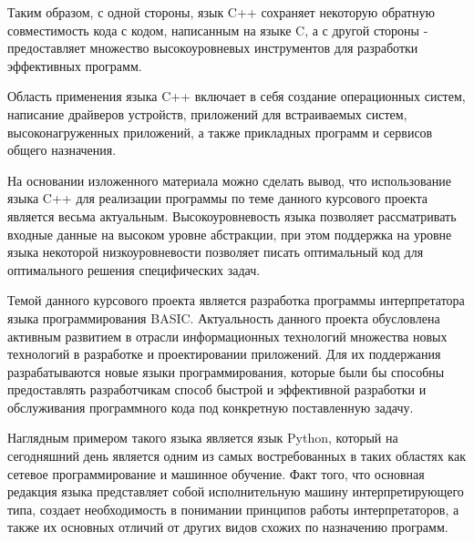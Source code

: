 Таким образом, с одной стороны, язык C++ сохраняет некоторую
обратную совместимость кода с кодом, написанным на языке C,
а с другой стороны - предоставляет множество высокоуровневых
инструментов для разработки эффективных программ.

Область применения языка C++ включает в себя создание
операционных систем, написание драйверов устройств,
приложений для встраиваемых систем, высоконагруженных приложений,
а также прикладных программ и сервисов общего назначения.

На основании изложенного материала можно сделать вывод,
что использование языка C++ для реализации программы
по теме данного курсового проекта является весьма актуальным.
Высокоуровневость языка позволяет рассматривать входные 
данные на высоком уровне абстракции, при этом
поддержка на уровне языка некоторой низкоуровневости 
позволяет писать оптимальный код 
для оптимального решения специфических задач.

Темой данного курсового проекта является разработка программы 
интерпретатора языка программирования BASIC. 
Актуальность данного проекта обусловлена активным развитием 
в отрасли информационных технологий множества новых технологий 
в разработке и проектировании приложений. 
Для их поддержания разрабатываются новые языки программирования, 
которые были бы способны предоставлять разработчикам способ 
быстрой и эффективной разработки и обслуживания 
программного кода под конкретную поставленную задачу. 

Наглядным примером такого языка является язык Python, 
который на сегодняшний день является одним из самых востребованных 
в таких областях как сетевое программирование и машинное обучение.
Факт того, что основная редакция языка представляет собой
исполнительную машину интерпретирующего типа, создает необходимость
в понимании принципов работы интерпретаторов, а также их основных
отличий от других видов схожих по назначению программ.